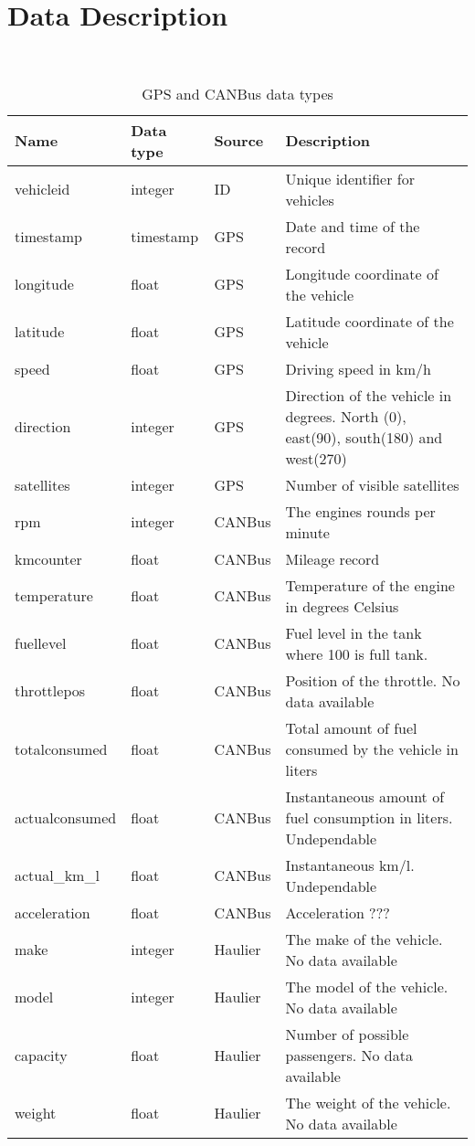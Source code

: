 \section{Data Description}
\\
\begin{table}[htb]
\begin{tabular}{|l|l|l|l|}\hline
Name & Data type & Source & Description\\\hline
vehicleid & integer & ID & Unique identifier for vehicles\\\hline
timestamp & timestamp & GPS & Date and time of the record\\\hline
longitude & float & GPS & Longitude coordinate of the vehicle\\\hline
latitude & float & GPS & Latitude coordinate of the vehicle\\\hline
speed & float & GPS & Driving speed in km/h\\\hline
direction & integer & GPS & Direction of the vehicle in degrees. North (0), east(90), south(180) and west(270)\\\hline
satellites & integer & GPS & Number of visible satellites\\\hline
rpm & integer & CANBus & The engines rounds per minute\\\hline
kmcounter & float & CANBus & Mileage record\\\hline
temperature & float & CANBus & Temperature of the engine in degrees Celsius\\\hline
fuellevel& float & CANBus & Fuel level in the tank where 100 is full tank.\\\hline
throttlepos & float & CANBus & Position of the throttle. No data available\\\hline
totalconsumed & float & CANBus & Total amount of fuel consumed by the vehicle in liters\\\hline
actualconsumed & float & CANBus & Instantaneous amount of fuel consumption in liters. Undependable\\\hline
actual\_km\_l & float & CANBus & Instantaneous km/l. Undependable\\\hline
acceleration & float & CANBus & Acceleration ???\\\hline %
make & integer & Haulier &The make of the vehicle. No data available\\\hline
model & integer & Haulier &The model of the vehicle. No data available\\\hline
capacity & float & Haulier & Number of possible passengers. No data available\\\hline
weight & float & Haulier & The weight of the vehicle. No data available\\\hline
\end{tabular}
\caption{GPS and CANBus data types}\label{tb:dataDescription}
\end{table}
\clearpage

